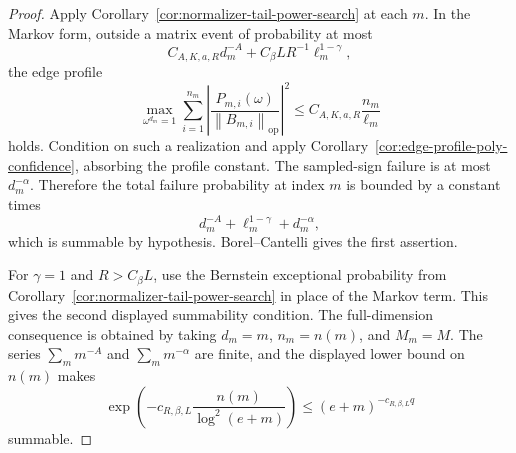 \documentclass[11pt]{amsart}
\numberwithin{equation}{section}
\theoremstyle{definition}
\theoremstyle{remark}
\newcommand{\op}{\mathrm{op}}
\newcommand{\norm}[1]{\left\lVert #1\right\rVert}
\begin{document}
\begin{proof}
Apply Corollary~\ref{cor:normalizer-tail-power-search} at each \(m\).  In the
Markov form, outside a matrix event of probability at most
\[
  C_{A,K,a,R}d_m^{-A}+C_\beta L R^{-1}\ell_m^{1-\gamma},
\]
the edge profile
\[
  \max_{\omega^{d_m}=1}
  \sum_{i=1}^{n_m}\left|
  \frac{P_{m,i}(\omega)}{\norm{B_{m,i}}_{\op}}\right|^2
  \le C_{A,K,a,R}\frac{n_m}{\ell_m}
\]
holds.  Condition on such a realization and apply
Corollary~\ref{cor:edge-profile-poly-confidence}, absorbing the profile constant.
The sampled-sign failure is at most \(d_m^{-\alpha}\).  Therefore the total
failure probability at index \(m\) is bounded by a constant times
\[
  d_m^{-A}+\ell_m^{1-\gamma}+d_m^{-\alpha},
\]
which is summable by hypothesis.  Borel--Cantelli gives the first assertion.

For \(\gamma=1\) and \(R>C_\beta L\), use the Bernstein exceptional probability
from Corollary~\ref{cor:normalizer-tail-power-search} in place of the Markov
term.  This gives the second displayed summability condition.  The
full-dimension consequence is obtained by taking \(d_m=m\), \(n_m=n(m)\), and
\(M_m=M\).  The series \(\sum_m m^{-A}\) and \(\sum_m m^{-\alpha}\) are finite,
and the displayed lower bound on \(n(m)\) makes
\[
  \exp\left(-c_{R,\beta,L}\frac{n(m)}{\log^2(e+m)}\right)
  \le (e+m)^{-c_{R,\beta,L}q}
\]
summable.
\end{proof}
\end{document}
